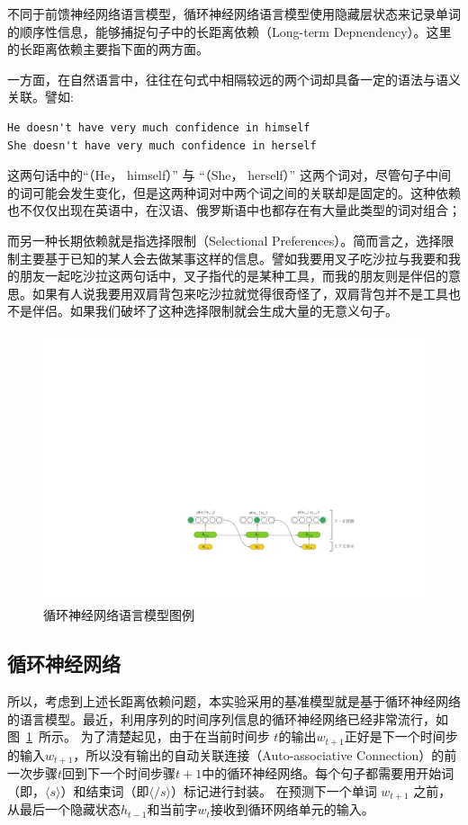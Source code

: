 不同于前馈神经网络语言模型，循环神经网络语言模型使用隐藏层状态来记录单词的顺序性信息，能够捕捉句子中的长距离依赖（Long-term Depnendency）。这里的长距离依赖主要指下面的两方面。

一方面，在自然语言中，往往在句式中相隔较远的两个词却具备一定的语法与语义关联。譬如:
\begin{verbatim}
He doesn't have very much confidence in himself
She doesn't have very much confidence in herself
\end{verbatim}
这两句话中的``（He， himself）'' 与 ``（She， herself）'' 这两个词对，尽管句子中间的词可能会发生变化，但是这两种词对中两个词之间的关联却是固定的。这种依赖也不仅仅出现在英语中，在汉语、俄罗斯语中也都存在有大量此类型的词对组合；

而另一种长期依赖就是指选择限制（Selectional Preferences）。简而言之，选择限制主要基于已知的某人会去做某事这样的信息。譬如我要用叉子吃沙拉与我要和我的朋友一起吃沙拉这两句话中，叉子指代的是某种工具，而我的朋友则是伴侣的意思。如果有人说我要用双肩背包来吃沙拉就觉得很奇怪了，双肩背包并不是工具也不是伴侣。如果我们破坏了这种选择限制就会生成大量的无意义句子。

\begin{figure}[!ht]
  \centering
  \includegraphics[width=1\columnwidth]{./figures/lm.pdf}
  \caption{循环神经网络语言模型图例}
  \label{fig:lm}
\end{figure}

\subsection{循环神经网络}
所以，考虑到上述长距离依赖问题，本实验采用的基准模型就是基于循环神经网络的语言模型。最近，利用序列的时间序列信息的循环神经网络已经非常流行，如图~\ref{fig:lm}~所示。 为了清楚起见，由于在当前时间步 $ t $的输出$ w_ {t + 1} $正好是下一个时间步的输入$ w_ {t + 1} $，所以没有输出的自动关联连接（Auto-associative Connection）的前一次步骤$ t $回到下一个时间步骤$ t + 1 $中的循环神经网络。每个句子都需要用开始词（即，$ \langle s \rangle $）和结束词（即$ \langle / s \rangle $）标记进行封装。 在预测下一个单词 $ w_ {t + 1} $ 之前，从最后一个隐藏状态$ h_ {t-1} $和当前字$ w_t $接收到循环网络单元的输入。

